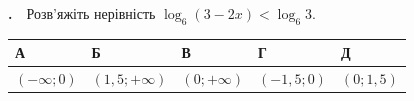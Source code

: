 \documentclass[12pt]{article}
\newlength{\nmtcellw}
\newcommand{\nmtSetCell}{\setlength{\nmtcellw}{\dimexpr(\linewidth-10\tabcolsep-6\arrayrulewidth)/5\relax}}
\newcommand{\answerTable}[5]{%
\par\nopagebreak\vspace{0.15cm}
\noindent\nmtSetCell
\begin{tabular}{|*{5}{>{\centering\arraybackslash}m{\nmtcellw}|}}
\hline
\rule[-0.15cm]{0pt}{0.6cm}\textbf{А} & \rule[-0.15cm]{0pt}{0.6cm}\textbf{Б} & \rule[-0.15cm]{0pt}{0.6cm}\textbf{В} & \rule[-0.15cm]{0pt}{0.6cm}\textbf{Г} & \rule[-0.15cm]{0pt}{0.6cm}\textbf{Д} \\
\hline
\rule[-0.2cm]{0pt}{0.75cm}#1 & \rule[-0.2cm]{0pt}{0.75cm}#2 & \rule[-0.2cm]{0pt}{0.75cm}#3 & \rule[-0.2cm]{0pt}{0.75cm}#4 & \rule[-0.2cm]{0pt}{0.75cm}#5 \\
\hline
\end{tabular}
\par\vspace{0.25cm}
}
\newcommand{\matchingGrid}{%
    \sbox{\nmtgridbox}{\matchingGridRaw}%
    \ifdim\wd\nmtgridbox>\linewidth \resizebox{\linewidth}{!}{\usebox{\nmtgridbox}}\else\usebox{\nmtgridbox}\fi}
\newcommand{\matchingGridRaw}{%
    \begingroup
    \renewcommand{\arraystretch}{1.15}
    \setlength{\tabcolsep}{4pt}
    \footnotesize
    \begin{tabular}{r|c|c|c|c|c|}
         \multicolumn{1}{c}{} & \multicolumn{1}{c}{\textbf{А}} & \multicolumn{1}{c}{\textbf{Б}} & \multicolumn{1}{c}{\textbf{В}} & \multicolumn{1}{c}{\textbf{Г}} & \multicolumn{1}{c}{\textbf{Д}} \\ \cline{2-6}
         \textbf{1} & \phantom{X} & \phantom{X} & \phantom{X} & \phantom{X} & \phantom{X} \\ \cline{2-6}
         \textbf{2} & & & & & \\ \cline{2-6}
         \textbf{3} & & & & & \\ \cline{2-6}
    \end{tabular}
    \endgroup
}
\newcounter{zad}
\newcommand{\zadtask}[1]{\stepcounter{zad}\noindent\textbf{\thezad.}\ \ #1\par\nopagebreak\vspace{0.2cm}}
\newcounter{ans}
\begin{document}
\begingroup
\providecommand{\trigStyle}[1]{#1}
\providecommand{\answerTableSmall}[5]{%
\begingroup\setlength{\tabcolsep}{2pt}\small\nmtSetCell
\begin{tabular}{|*{5}{>{\centering\arraybackslash}m{\nmtcellw}|}}
\hline
\rule[-0.2cm]{0pt}{0.6cm}\textbf{А} & \textbf{Б} & \textbf{В} & \textbf{Г} & \textbf{Д} \\
\hline
\rule[-0.4cm]{0pt}{0.9cm}#1 & \rule[-0.4cm]{0pt}{0.9cm}#2 & \rule[-0.4cm]{0pt}{0.9cm}#3 & \rule[-0.4cm]{0pt}{0.9cm}#4 & \rule[-0.4cm]{0pt}{0.9cm}#5 \\
\hline
\end{tabular}\endgroup}
\providecommand{\matchingLayout}[3]{%
    \noindent
    \begin{minipage}[t]{0.36\textwidth}\vspace{0pt}\raggedright
        #1
    \end{minipage}%
    \hfill
    \begin{minipage}[t]{0.43\textwidth}\vspace{0pt}\raggedright
        #2
    \end{minipage}%
    \hfill
    \begin{minipage}[t]{0.19\textwidth}
        \vspace{0pt}
        \begin{flushright}
        #3
        \end{flushright}
    \end{minipage}}
\providecommand{\matchingLayoutBottom}[2]{%
    \noindent
    \begin{minipage}[t]{0.48\textwidth}\vspace{0pt}\raggedright
        #1
    \end{minipage}%
    \hfill
    \begin{minipage}[t]{0.48\textwidth}\vspace{0pt}\raggedright
        #2
    \end{minipage}
    \vspace{0.5cm}
    \noindent
    \matchingGrid}
\providecommand{\answerListVertical}[5]{%
    \par\nopagebreak\vspace{0.2cm}
    \begin{itemize}[itemsep=0.4cm, leftmargin=1.5cm, labelsep=0.5cm]
        \item[\textbf{А}] #1
        \item[\textbf{Б}] #2
        \item[\textbf{В}] #3
        \item[\textbf{Г}] #4
        \item[\textbf{Д}] #5
    \end{itemize}
    \vspace{0.2cm}}
\begin{samepage}
\zadtask{Розв'яжіть нерівність $\log_6(3 - 2x) < \log_6 3$.}
\answerTable{$(-\infty; 0)$}{$(1{,}5; +\infty)$}{$(0; +\infty)$}{$(-1{,}5; 0)$}{$(0; 1{,}5)$}
\par{}
\end{samepage}
\endgroup
\end{document}
